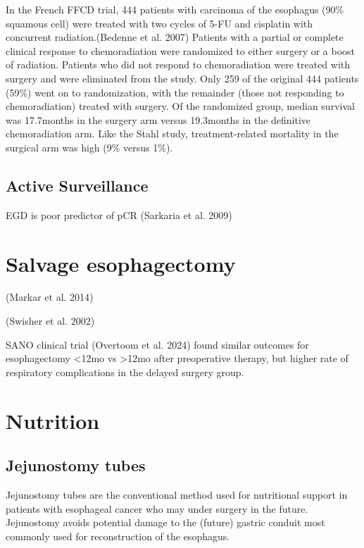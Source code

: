 \documentclass[
  letterpaper,
]{scrbook}
\begin{document}
In the French FFCD trial, 444 patients with carcinoma of the esophagus
(90\% squamous cell) were treated with two cycles of 5-FU and cisplatin
with concurrent radiation.(Bedenne et al. 2007) Patients with a partial
or complete clinical response to chemoradiation were randomized to
either surgery or a boost of radiation. Patients who did not respond to
chemoradiation were treated with surgery and were eliminated from the
study. Only 259 of the original 444 patients (59\%) went on to
randomization, with the remainder (those not responding to
chemoradiation) treated with surgery. Of the randomized group, median
survival was 17.7months in the surgery arm versus 19.3months in the
definitive chemoradiation arm. Like the Stahl study, treatment-related
mortality in the surgical arm was high (9\% versus 1\%).

\section{Active Surveillance}\label{active-surveillance-1}

EGD is poor predictor of pCR (Sarkaria et al. 2009)

\chapter{Salvage esophagectomy}\label{salvage-esophagectomy}

(Markar et al. 2014)

(Swisher et al. 2002)

SANO clinical trial (Overtoom et al. 2024) found similar outcomes for
esophagectomy \textless12mo vs \textgreater12mo after preoperative
therapy, but higher rate of respiratory complications in the delayed
surgery group.

\chapter{Nutrition}\label{eso_nutrition}

\section{Jejunostomy tubes}\label{jejunostomy-tubes-1}

Jejunostomy tubes are the conventional method used for nutritional
support in patients with esophageal cancer who may under surgery in the
future. Jejunostomy avoids potential damage to the (future) gastric
conduit most commonly used for reconstruction of the esophagus.
\end{document}
